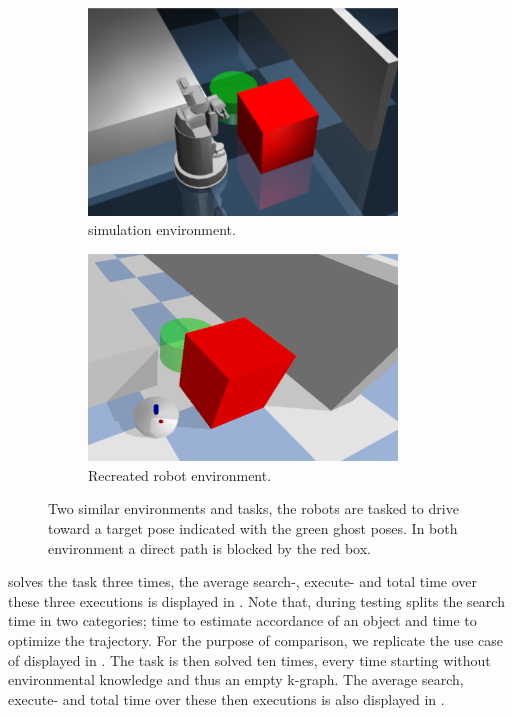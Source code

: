 \begin{figure}[H]
    \centering
    \begin{subfigure}{.49\textwidth}
    \centering
    \includegraphics[width=0.9\textwidth]{figures/results/wang_env}
    \caption{\citeauthor{wang_affordancebased_2020} simulation environment.}%
    \label{subfig:wang_env}
    \end{subfigure}
    \hfill
    \begin{subfigure}{.49\textwidth}
    \centering
    \includegraphics[width=0.9\textwidth]{figures/results/wang_mimick}
    \caption{Recreated robot environment.}%
    \label{subfig:wang_mimick}
    \end{subfigure}
    \caption{Two similar environments and tasks, the robots are tasked to drive toward a target pose indicated with the green ghost poses. In both environment a direct path is blocked by the red box.}%
    \label{fig:wang}
\end{figure}

\citeauthor{wang_affordancebased_2020} solves the task three times, the average search-, execute- and total time over these three executions is displayed in . Note that, during testing \citeauthor{wang_affordancebased_2020} splits the search time in two categories; time to estimate accordance of an object and time to optimize the trajectory. For the purpose of comparison, we replicate the use case of \citeauthor{wang_affordancebased_2020} displayed in . The task is then solved ten times, every time starting without environmental knowledge and thus an empty \ac{k-graph}. The average search, execute- and total time over these then executions is also displayed in .\bs

